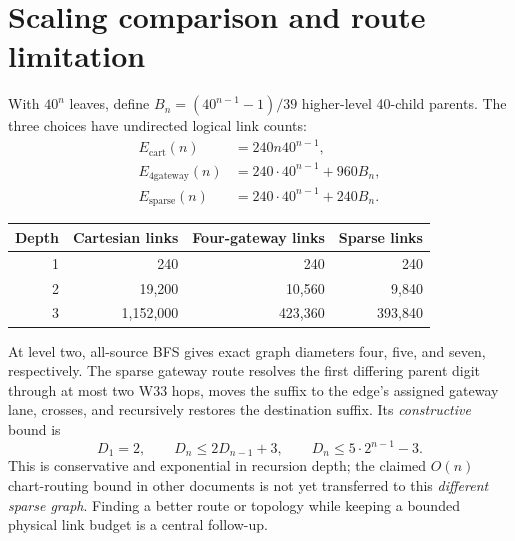 \documentclass[10pt]{article}
\begin{document}
\section{Scaling comparison and route limitation}
With $40^n$ leaves, define $B_n=(40^{n-1}-1)/39$
higher-level 40-child parents. The three choices have undirected
logical link counts:
\[
\begin{aligned}
E_{\mathrm{cart}}(n)&=240n40^{n-1},\\
E_{\mathrm{4gateway}}(n)&=240\cdot40^{n-1}+960 B_n,\\
E_{\mathrm{sparse}}(n)&=240\cdot40^{n-1}+240 B_n.
\end{aligned}
\]
\begin{center}
\begin{tabular}{rrrr}
\toprule
Depth & Cartesian links & Four-gateway links & Sparse links\\
\midrule
1 & 240 & 240 & 240\\
2 & 19,200 & 10,560 & 9,840\\
3 & 1,152,000 & 423,360 & 393,840\\
\bottomrule
\end{tabular}
\end{center}
At level two, all-source BFS gives exact graph diameters
four, five, and seven, respectively.
The sparse gateway route resolves the first differing parent
digit through at most two W33 hops, moves the suffix to the
edge's assigned gateway lane, crosses, and recursively
restores the destination suffix. Its \emph{constructive} bound is
\[
D_1=2,\qquad D_n\le 2D_{n-1}+3,\qquad
D_n\le5\cdot2^{n-1}-3.
\]
This is conservative and exponential in recursion depth;
the claimed $O(n)$ chart-routing bound in other documents
is not yet transferred to this \emph{different sparse graph}.
Finding a better route or topology while keeping a bounded
physical link budget is a central follow-up.
\end{document}
